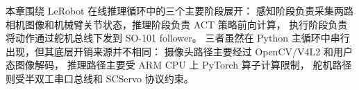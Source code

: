 本章围绕 LeRobot 在线推理循环中的三个主要阶段展开：
感知阶段负责采集两路相机图像和机械臂关节状态，推理阶段负责 ACT 策略前向计算，
执行阶段负责将动作通过舵机总线下发到 SO-101 follower。
三者虽然在 Python 主循环中串行出现，但其底层开销来源并不相同：
摄像头路径主要经过 OpenCV/V4L2 和用户态图像解码，
推理路径主要受 ARM CPU 上 PyTorch 算子计算限制，
舵机路径则受半双工串口总线和 SCServo 协议约束。





